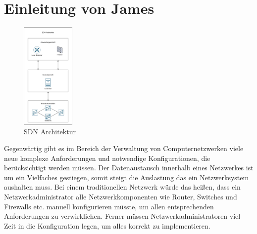 \documentclass[fontsize=12pt,paper=a4,open=any,parskip=half,
  twoside=false,toc=listof,toc=bibliography,fleqn,leqno,
  captions=nooneline,captions=tableabove,british]{scrbook}
\begin{document}
\section*{Einleitung von James}\label{einl-james}
\begin{figure}
	\vspace{-\baselineskip}
	\centering
	\includegraphics[width=0.23\textwidth]{Bilder/layer1}
	\caption{SDN Architektur}
	\label{layer1}
\end{figure}
Gegenwärtig gibt es im Bereich der Verwaltung von Computernetzwerken viele neue komplexe Anforderungen und notwendige Konfigurationen, die berücksichtigt werden müssen.  Der Datenaustausch innerhalb eines Netzwerkes ist um ein Vielfaches gestiegen, somit steigt die Auslastung das ein Netzwerksystem aushalten muss. Bei einem traditionellen Netzwerk würde das heißen, dass ein Netzwerkadministrator alle Netzwerkkomponenten wie Router, Switches und Firewalls etc. manuell konfigurieren müsste, um allen entsprechenden Anforderungen zu verwirklichen. Ferner müssen Netzwerkadministratoren viel Zeit in die Konfiguration legen, um alles korrekt zu implementieren.\par
\end{document}
